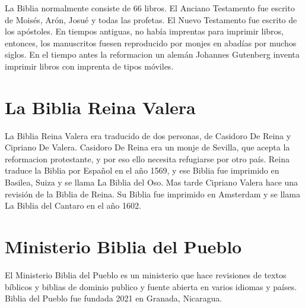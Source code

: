 La Biblia normalmente consiste de 66 libros. El Anciano Testamento fue
escrito de Moisés, Arón, Josué y todas las profetas. El Nuevo Testamento
fue escrito de los apóstoles. En tiempos antiguas, no había imprentas
para imprimir libros, entonces, los manuscritos fuesen reproducido por
monjes en abadías por muchos siglos. En el tiempo antes la reformacion
un alemán Johannes Gutenberg inventa imprimir libros con imprenta de
tipos móviles.

\hypertarget{la-biblia-reina-valera}{%
\section{La Biblia Reina Valera}\label{la-biblia-reina-valera}}

La Biblia Reina Valera era traducido de dos personas, de Casidoro De
Reina y Cipriano De Valera. Casidoro De Reina era un monje de Sevilla,
que acepta la reformacion protestante, y por eso ello necesita
refugiarse por otro país. Reina traduce la Biblia por Español en el año
1569, y ese Biblia fue imprimido en Basilea, Suiza y se llama La Biblia
del Oso. Mas tarde Cipriano Valera hace una revisión de la Biblia de
Reina. Su Biblia fue imprimido en Amsterdam y se llama La Biblia del
Cantaro en el año 1602.

\hypertarget{ministerio-biblia-del-pueblo}{%
\section{Ministerio Biblia del
Pueblo}\label{ministerio-biblia-del-pueblo}}

El Ministerio Biblia del Pueblo es un ministerio que hace revisiones de
textos bíblicos y biblias de dominio publico y fuente abierta en varios
idiomas y países. Biblia del Pueblo fue fundada 2021 en Granada,
Nicaragua.
